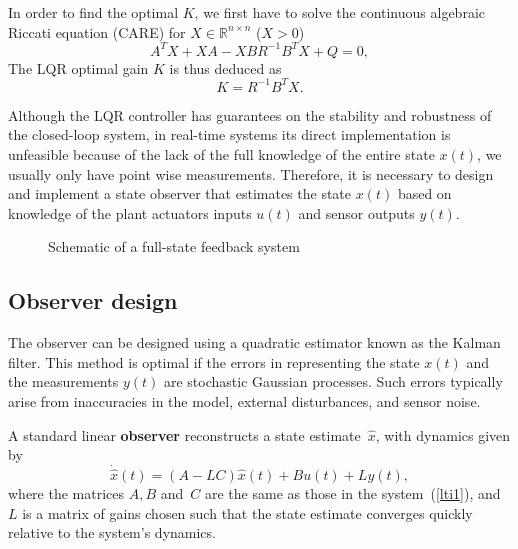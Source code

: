 \documentclass[12pt,lot, lof]{puthesis}
\begin{document}
In order to find the optimal $K$, we first have to solve the continuous algebraic Riccati equation (CARE) for $X \in \mathbb{R}^{n \times n}$ ($X>0$)
\begin{equation}
A^T X + X A - X B R^{-1} B^T X + Q = 0,
\end{equation}
The LQR optimal gain $K$ is thus deduced as
\begin{equation}
K = R^{-1}B^T X.
\end{equation}

Although the LQR controller has guarantees on the stability and robustness of the closed-loop system, in real-time systems its direct implementation is unfeasible because of the lack of the full knowledge of the entire state $x(t)$, we usually only have point wise measurements. Therefore, it is necessary to design and implement a state observer that estimates the state $x(t)$ based on knowledge of the plant actuators inputs $u(t)$ and sensor outputs $y(t)$.

\begin{figure}[htbp]
  \centering
  \caption{Schematic of a full-state feedback system}
\end{figure}


\subsection{ Observer design}
The observer can be designed using a quadratic estimator known as the Kalman filter. This method is optimal if the errors in representing the state $x(t)$ and the measurements $y(t)$ are stochastic Gaussian processes. Such errors typically arise from inaccuracies in the model, external disturbances, and sensor noise.

A standard linear \textbf{observer} reconstructs a state estimate~$\hat x$, with dynamics given by
\begin{equation}
		\dot{\hat{x}}(t) = (A- L C) \hat{x}(t) + B u(t) + L y(t),
		\label{obslti}
\end{equation}
where the matrices $A,B$ and~$C$ are the same as those in the system~(\ref{lti1}), and $L$ is a matrix of gains chosen such that the state estimate converges quickly relative to the system's dynamics.
\end{document}
